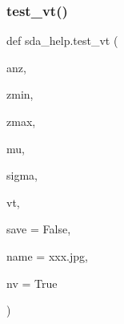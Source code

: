 \mbox{\label{namespacesda__help_a474de660167669e393d497758d0f6bfa}} 
\subsubsection{\texorpdfstring{test\+\_\+vt()}{test\_vt()}}
{\footnotesize\ttfamily def sda\+\_\+help.\+test\+\_\+vt (\begin{DoxyParamCaption}\item[{}]{anz,  }\item[{}]{zmin,  }\item[{}]{zmax,  }\item[{}]{mu,  }\item[{}]{sigma,  }\item[{}]{vt,  }\item[{}]{save = {\ttfamily False},  }\item[{}]{name = {\ttfamily \textquotesingle{}xxx.jpg\textquotesingle{}},  }\item[{}]{nv = {\ttfamily True} }\end{DoxyParamCaption})}

